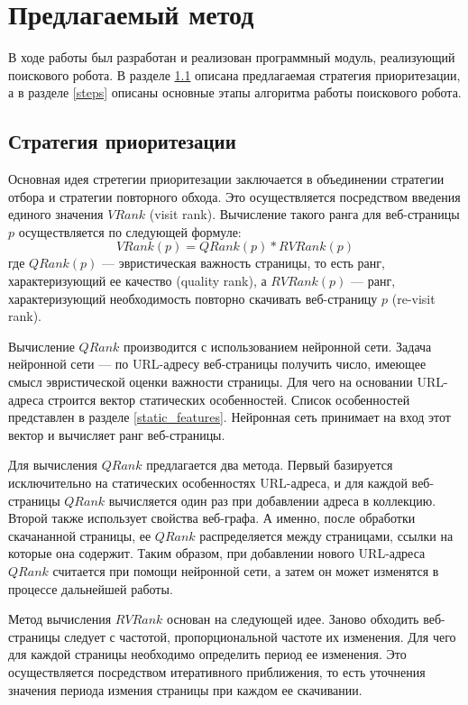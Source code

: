 \chapter{Предлагаемый метод}
\label{chapter_method}

В ходе работы был разработан и реализован программный модуль, реализующий поискового робота. В разделе \ref{strategy} описана предлагаемая стратегия приоритезации, а в разделе \ref{steps} описаны основные этапы алгоритма работы поискового робота.

\section{Стратегия приоритезации}
\label{strategy}

Основная идея стретегии приоритезации заключается в объединении стратегии отбора и стратегии повторного обхода. Это осуществляется посредством введения единого значения $VRank$ (visit rank). Вычисление такого ранга для веб-страницы $p$ осуществляется по следующей формуле:
$$VRank(p) = QRank(p) * RVRank(p)$$
где $QRank(p)$ --- эвристическая важность страницы, то есть ранг, характеризующий ее качество (quality rank), а $RVRank(p)$ --- ранг, характеризующий необходимость повторно скачивать веб-страницу $p$ (re-visit rank). 

Вычисление $QRank$ производится с использованием нейронной сети. Задача нейронной сети --- по URL-адресу веб-страницы получить число, имеющее смысл эвристической оценки важности страницы. Для чего на основании URL-адреса строится вектор статических особенностей. Список особенностей представлен в разделе \ref{static_features}. Нейронная сеть принимает на вход этот вектор и вычисляет ранг веб-страницы.

Для вычисления $QRank$ предлагается два метода. Первый базируется исключительно на статических особенностях URL-адреса, и для каждой веб-страницы $QRank$ вычисляется один раз при добавлении адреса в коллекцию. Второй также использует свойства веб-графа. А именно, после обработки скачананной страницы, ее $QRank$ распределяется между страницами, ссылки на которые она содержит. Таким образом, при добавлении нового URL-адреса $QRank$ считается при помощи нейронной сети, а затем он может изменятся в процессе дальнейшей работы.

Метод вычисления $RVRank$ основан на следующей идее. Заново обходить веб-страницы следует с частотой, пропорциональной частоте их изменения. Для чего для каждой страницы необходимо определить период ее изменения. Это осуществляется посредством итеративного приближения, то есть уточнения значения периода измения страницы при каждом ее скачивании.


